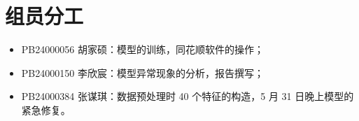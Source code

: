 \documentclass[fontset=mac]{ctexart}
\begin{document}
\section{组员分工}

\begin{itemize}[noitemsep]
    \item PB24000056 胡家硕：模型的训练，同花顺软件的操作；
    \item PB24000150 李欣宸：模型异常现象的分析，报告撰写；
    \item PB24000384 张谋琪：数据预处理时 40 个特征的构造，5 月 31 日晚上模型的紧急修复。
\end{itemize}
\end{document}
